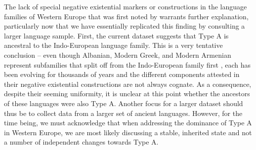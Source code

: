 \documentclass[output=paper,colorlinks,citecolor=brown]{langscibook}
\begin{document}
The lack of special negative existential markers or constructions in the
language families of Western Europe that was first noted by
\citet[117]{Veselinova2013} warrants further explanation, particularly now
that we have essentially replicated this finding by consulting a larger
language sample. First, the current dataset suggests that Type A is
ancestral to the Indo-European language family. This is a very tentative
conclusion – even though Albanian, Modern Greek, and Modern Armenian
represent subfamilies that split off from the Indo-European family first
\parencite[at least in][]{BouckaertLemey2012}, each has been evolving for
thousands of years and the different components attested in their negative
existential constructions are not always cognate. As a consequence, despite
their seeming uniformity, it is unclear at this point whether the ancestors
of these languages were also Type A. Another focus for a larger dataset
should thus be to collect data from a larger set of ancient languages.
However, for the time being, we must acknowledge that when addressing the
dominance of Type A in Western Europe, we are most likely discussing a
stable, inherited state \parencite[see][19]{Croft1991} and not a number of independent changes towards Type A. 
\end{document}
